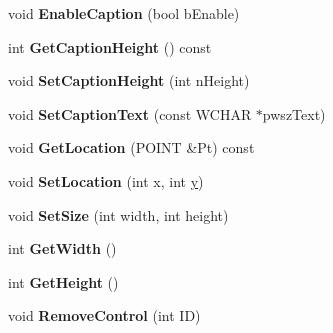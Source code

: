 \begin{DoxyCompactItemize}
\item 
\hypertarget{class_c_d_x_u_t_dialog_ac0fabdca39baa6ed68e5754f99cf5b81}{void {\bfseries Enable\+Caption} (bool b\+Enable)}\label{class_c_d_x_u_t_dialog_ac0fabdca39baa6ed68e5754f99cf5b81}

\item 
\hypertarget{class_c_d_x_u_t_dialog_a72a80373de83c0a368e04e9d1266494c}{int {\bfseries Get\+Caption\+Height} () const }\label{class_c_d_x_u_t_dialog_a72a80373de83c0a368e04e9d1266494c}

\item 
\hypertarget{class_c_d_x_u_t_dialog_a548f7b6caf0780730978344b746351eb}{void {\bfseries Set\+Caption\+Height} (int n\+Height)}\label{class_c_d_x_u_t_dialog_a548f7b6caf0780730978344b746351eb}

\item 
\hypertarget{class_c_d_x_u_t_dialog_abdf008c43c24525341ca8db2742eb042}{void {\bfseries Set\+Caption\+Text} (const W\+C\+H\+A\+R $\ast$pwsz\+Text)}\label{class_c_d_x_u_t_dialog_abdf008c43c24525341ca8db2742eb042}

\item 
\hypertarget{class_c_d_x_u_t_dialog_a3ecfd786f830d0049a22f3934eac6bfe}{void {\bfseries Get\+Location} (P\+O\+I\+N\+T \&Pt) const }\label{class_c_d_x_u_t_dialog_a3ecfd786f830d0049a22f3934eac6bfe}

\item 
\hypertarget{class_c_d_x_u_t_dialog_af42fdc0cacf7eef44dc518f0cc9903c5}{void {\bfseries Set\+Location} (int x, int \hyperlink{_ice_utils_8h_aa7ffaed69623192258fb8679569ff9ba}{y})}\label{class_c_d_x_u_t_dialog_af42fdc0cacf7eef44dc518f0cc9903c5}

\item 
\hypertarget{class_c_d_x_u_t_dialog_adb63ce7dfbc73250cf7ecd45b424ab96}{void {\bfseries Set\+Size} (int width, int height)}\label{class_c_d_x_u_t_dialog_adb63ce7dfbc73250cf7ecd45b424ab96}

\item 
\hypertarget{class_c_d_x_u_t_dialog_a6dd8c238656eb7260e0eddb8a2c1ec69}{int {\bfseries Get\+Width} ()}\label{class_c_d_x_u_t_dialog_a6dd8c238656eb7260e0eddb8a2c1ec69}

\item 
\hypertarget{class_c_d_x_u_t_dialog_ae6cae46633b8133c0447dcc0e9ae2bdf}{int {\bfseries Get\+Height} ()}\label{class_c_d_x_u_t_dialog_ae6cae46633b8133c0447dcc0e9ae2bdf}

\item 
\hypertarget{class_c_d_x_u_t_dialog_ae30dd98c7baecd3d544ab15c17a32bd3}{void {\bfseries Remove\+Control} (int I\+D)}\label{class_c_d_x_u_t_dialog_ae30dd98c7baecd3d544ab15c17a32bd3}


\end{DoxyCompactItemize}
